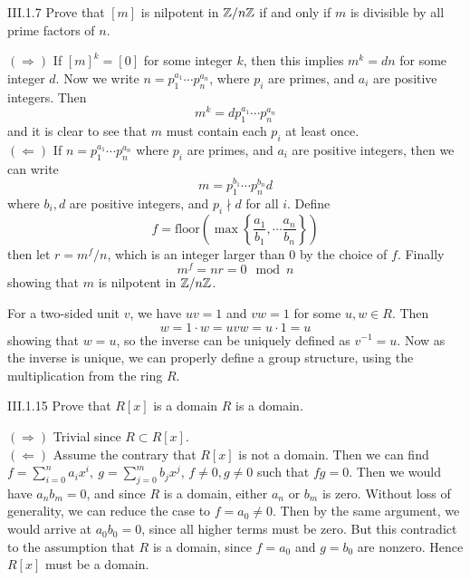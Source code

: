 \begin{problem}{III.1.7}
Prove that $[m]$ is nilpotent in $\mathbb{Z}/n\mathbb{Z}$ if and only if $m$ is divisible by all prime factors of $n$. 
\end{problem}
\begin{pf}

\noindent $(\Rightarrow)$ If $[m]^k = [0]$ for some integer $k$, then this implies $m^k = dn$ for some integer $d$. Now we write $n = p_1^{a_1} \cdots p_n^{a_n}$, where $p_i$ are primes, and $a_i$ are positive integers. Then
\[
m^k = d p_1^{a_1} \cdots p_n^{a_n}
\]
and it is clear to see that $m$ must contain each $p_i$ at least once. \\
$(\Leftarrow)$ If $n = p_1^{a_1} \cdots p_n^{a_n}$ where $p_i$ are primes, and $a_i$ are positive integers, then we can write 
\[
m = p_1^{b_1} \cdots p_n^{b_n} d
\] 
where $b_i, d$ are positive integers, and $p_i \nmid d$ for all $i$. Define 
\[
f = \text{floor}\left(\max\left\{ \frac{a_1}{b_1}, \cdots \frac{a_n}{b_n}\right\} \right)    
\]
then let $r = m^f/n$, which is an integer larger than 0 by the choice of $f$. Finally
\[
m^f = nr = 0 \mod n
\]
showing that $m$ is nilpotent in $\mathbb{Z}/n\mathbb{Z}$.
\end{pf}

\begin{pf}
For a two-sided unit $v$, we have $uv = 1$ and $vw = 1$ for some $u,w \in R$. Then 
\[
w = 1 \cdot w = uvw = u \cdot 1 = u    
\]
showing that $w = u$, so the inverse can be uniquely defined as $v^{-1} = u$. Now as the inverse is unique, we can properly define a group structure, using the multiplication from the ring $R$.
\end{pf}

\begin{problem}{III.1.15}
Prove that $R[x]$ is a domain \iffw $R$ is a domain.
\end{problem}
\begin{pf}

\noindent $(\Rightarrow)$ Trivial since $R \subset R[x]$. \\
$(\Leftarrow)$ Assume the contrary that $R[x]$ is not a domain. Then we can find $f = \sum_{i=0}^n a_ix^i, \: g = \sum_{j=0}^m b_jx^j$, $f \neq 0, g \neq 0$ such that $fg = 0$. Then we would have $a_nb_m = 0$, and since $R$ is a domain, either $a_n$ or $b_m$ is zero. Without loss of generality, we can reduce the case to $f = a_0 \neq 0$. Then by the same argument, we would arrive at $a_0b_0 = 0$, since all higher terms must be zero. But this contradict to the assumption that $R$ is a domain, since $f = a_0$ and $g = b_0$ are nonzero. Hence $R[x]$ must be a domain.
\end{pf}

